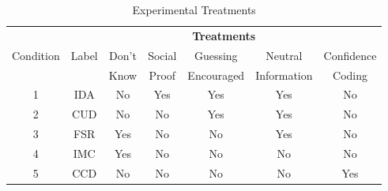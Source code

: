 \begin{table}[H]
\centering
\caption{Experimental Treatments}
\label{tab:conditions}
\begin{tabular}{ccccccc}
\hline
           & \multicolumn{6}{c}{\textbf{Treatments}}              \\
 Condition & Label & Don't & Social & Guessing   & Neutral     & Confidence \\
           &       & Know  & Proof  & Encouraged & Information & Coding  \\ \hline
 1        & IDA    & No    & Yes    & Yes        &  Yes        & No         \\
 2        & CUD    & No    & No     & Yes        &  Yes        & No         \\
 3        & FSR    & Yes   & No     & No         &  Yes        & No         \\
 4        & IMC    & Yes   & No     & No         &  No         & No         \\
 5        & CCD    & No    & No     & No         &  No         & Yes        \\ \hline
\end{tabular}
\end{table}
